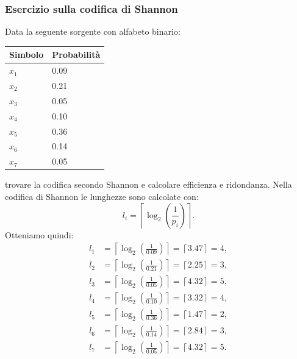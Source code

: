 \documentclass{article}
\theoremstyle{definition}
\numberwithin{equation}{section}
\begin{document}
\subsubsection{Esercizio sulla codifica di Shannon}\label{esercizio_codifica_shannon}
Data la seguente sorgente con alfabeto binario:
\begin{center}
    \begin{tabular}{|l|l|}
        \hline
        \textbf{Simbolo} & \textbf{Probabilità} \\ \hline
        $x_1$            & 0.09                 \\ \hline
        $x_2$            & 0.21                 \\ \hline
        $x_3$            & 0.05                 \\ \hline
        $x_4$            & 0.10                 \\ \hline
        $x_5$            & 0.36                 \\ \hline
        $x_6$            & 0.14                 \\ \hline
        $x_7$            & 0.05                 \\ \hline
    \end{tabular}
\end{center}
trovare la codifica secondo Shannon e calcolare efficienza e ridondanza. Nella codifica di Shannon le lunghezze sono calcolate con:
\[
    l_i = \left\lceil \log_2\!\left(\frac{1}{p_i}\right) \right\rceil.
\]
Otteniamo quindi:
\begin{align*}
    l_1 & = \left\lceil \log_2\left(\frac{1}{0.09}\right) \right\rceil = \left\lceil 3.47 \right\rceil = 4, \\
    l_2 & = \left\lceil \log_2\left(\frac{1}{0.21}\right) \right\rceil = \left\lceil 2.25 \right\rceil = 3, \\
    l_3 & = \left\lceil \log_2\left(\frac{1}{0.05}\right) \right\rceil = \left\lceil 4.32 \right\rceil = 5, \\
    l_4 & = \left\lceil \log_2\left(\frac{1}{0.10}\right) \right\rceil = \left\lceil 3.32 \right\rceil = 4, \\
    l_5 & = \left\lceil \log_2\left(\frac{1}{0.36}\right) \right\rceil = \left\lceil 1.47 \right\rceil = 2, \\
    l_6 & = \left\lceil \log_2\left(\frac{1}{0.14}\right) \right\rceil = \left\lceil 2.84 \right\rceil = 3, \\
    l_7 & = \left\lceil \log_2\left(\frac{1}{0.05}\right) \right\rceil = \left\lceil 4.32 \right\rceil = 5.
\end{align*}
\end{document}
